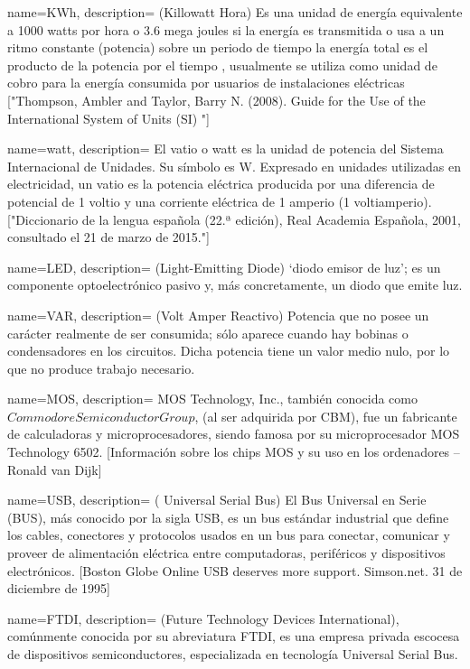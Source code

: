{
      name=KWh,
  description={ (Killowatt Hora) Es una unidad de energía equivalente a 1000 watts por hora o 3.6 mega joules si la energía es transmitida o usa a un ritmo constante  (potencia) sobre un periodo de tiempo la energía total es el producto de la potencia por el tiempo , usualmente se utiliza como unidad de cobro para la energía consumida por usuarios de instalaciones eléctricas ["Thompson, Ambler and Taylor, Barry N. (2008). Guide for the Use of the International System of Units (SI) "] }
}

{
      name=watt,
  description={  El vatio o watt es la unidad de potencia del Sistema Internacional de Unidades. Su símbolo es W. Expresado en unidades utilizadas en electricidad, un vatio es la potencia eléctrica producida por una diferencia de potencial de 1 voltio y una corriente eléctrica de 1 amperio (1 voltiamperio). ["Diccionario de la lengua española (22.ª edición), Real Academia Española, 2001, consultado el 21 de marzo de 2015."] }
}

{
      name=LED,
  description={ (Light-Emitting Diode) ‘diodo emisor de luz’; es un componente optoelectrónico pasivo y, más concretamente, un diodo que emite luz.}
}

{
      name=VAR,
  description={ (Volt Amper Reactivo) Potencia que no posee un carácter realmente de ser consumida; sólo aparece cuando hay bobinas o condensadores en los circuitos. Dicha potencia tiene un valor medio nulo, por lo que no produce trabajo necesario. 
  }
  }


{
      name=MOS,
  description={ MOS Technology, Inc., también conocida como $Commodore Semiconductor Group$, (al ser adquirida por CBM), fue un fabricante de calculadoras y microprocesadores, siendo famosa por su microprocesador MOS Technology 6502. [Información sobre los chips MOS y su uso en los ordenadores – Ronald van Dijk]
}
}

{
      name=USB,
  description={ ( Universal Serial Bus) El Bus Universal en Serie (BUS), más conocido por la sigla USB, es un bus estándar industrial que define los cables, conectores y protocolos usados en un bus para conectar, comunicar y proveer de alimentación eléctrica entre computadoras, periféricos y dispositivos electrónicos. [Boston Globe Online  USB deserves more support. Simson.net. 31 de diciembre de 1995]
  }
  }

{
      name=FTDI,
  description={ (Future Technology Devices International), comúnmente conocida por su abreviatura FTDI, es una empresa privada escocesa de dispositivos semiconductores, especializada en tecnología Universal Serial Bus. }
}
